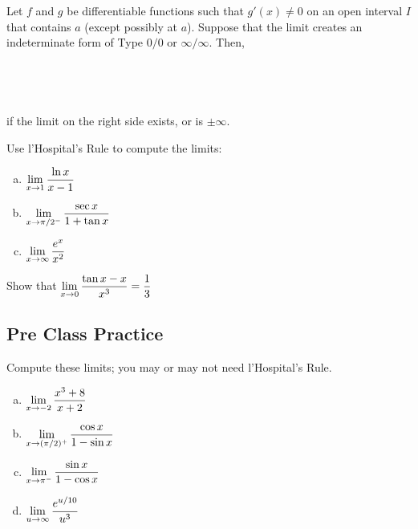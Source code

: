 \documentclass[notes]{subfiles}
\begin{document}
		\begin{rmk}
			Let \(f\) and \(g\) be differentiable functions such that \(g'(x)\neq 0\) on an open interval \(I\) that contains \(a\) (except possibly at \(a\)).  Suppose that the limit creates an indeterminate form of Type \(0/0\) or \(\infty/\infty\).  Then, \\ \\ \\ \\ \\
			
			if the limit on the right side exists, or is \(\pm \infty\).
		\end{rmk}
		
		\begin{ex}
			Use l'Hospital's Rule to compute the limits:
			\begin{enumerate}[(a)]
				\item\(\displaystyle\lim_{x\to 1} \dfrac{\ln x}{x - 1}\)
				\item \(\displaystyle \lim_{x\to \pi/2^-} \dfrac{\sec x}{1+\tan x}\)
				\item \(\displaystyle \lim_{x\to \infty} \dfrac{e^x}{x^2}\)
			\end{enumerate}
		\end{ex}
		
		\begin{ex}
			Show that \(\displaystyle \lim_{x \to 0} \dfrac{\tan x - x}{x^3} = \dfrac{1}{3}\)
		\end{ex}
			\vs{2}
			\newpage

	\subsection*{Pre Class Practice}
		\begin{ex}
			Compute these limits; you may or may not need l'Hospital's Rule.  
			\begin{enumerate}[(a)]
				\item \(\displaystyle \lim_{x\to -2} \dfrac{x^3+8}{x+2}\)
					\vs{1}
					
				\item \(\displaystyle \lim_{x\to (\pi/2)^+} \dfrac{\cos x}{1-\sin x}\)
					\vs{1}
					
				\item \(\displaystyle \lim_{x\to \pi^-} \dfrac{\sin x}{1-\cos x}\)
					\vs{1}
					
				\item \(\displaystyle \lim_{u\to \infty} \dfrac{e^{u/10}}{u^3}\)
					\vs{1}
			\end{enumerate}
		\end{ex}
		\newpage
\end{document}
